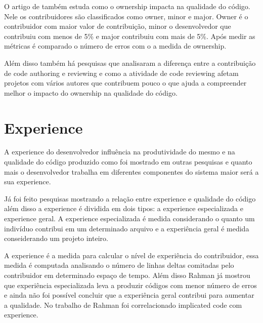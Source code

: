 O artigo de  também estuda como o ownership impacta na qualidade do código. Nele os contribuidores são classificados como owner, minor e major. Owner é o contribuidor com maior valor de contribuição, minor o desenvolvedor que contribuiu com menos de 5\% e major contribuiu com mais de 5\%. Após medir as métricas é comparado o número de erros com o a medida de ownership.

Além disso também há pesquisas\cite{Thongtanunam} que analisaram a diferença entre a contribuição de code authoring e reviewing e como a atividade de code reviewing afetam projetos com vários autores que contribuem pouco o que ajuda a compreender melhor o impacto do ownership na qualidade do código.

\section{Experience}
A experience do desenvolvedor influência na produtividade do mesmo e na qualidade do código produzido como foi mostrado em outras pesquisas\cite{Rahman2011}\cite{10.2307/2634607} e quanto mais o desenvolvedor trabalha em diferentes componentes do sistema maior será a sua experience.

Já foi feito pesquisas\cite{Rahman2011} mostrando a relação entre experience e qualidade do código além disso a experience é dividida em dois tipos: a experience especializada e experience geral. A experience especializada é medida considerando o quanto um indivíduo contribui em um determinado arquivo e a experiência geral é medida conseiderando um projeto inteiro.

A experience é a medida para calcular o nível de experiência do contribuidor, essa medida é computada analisando o número de linhas\cite{Rahman2011} deltas comitadas pelo contribuidor em determinado espaço de tempo. Além disso Rahman já mostrou que experiência especializada leva a produzir códigos com menor número de erros e ainda não foi possível concluir que a experiência geral contribui para aumentar a qualidade. No trabalho de Rahman foi correlacionado implicated code com experience.

